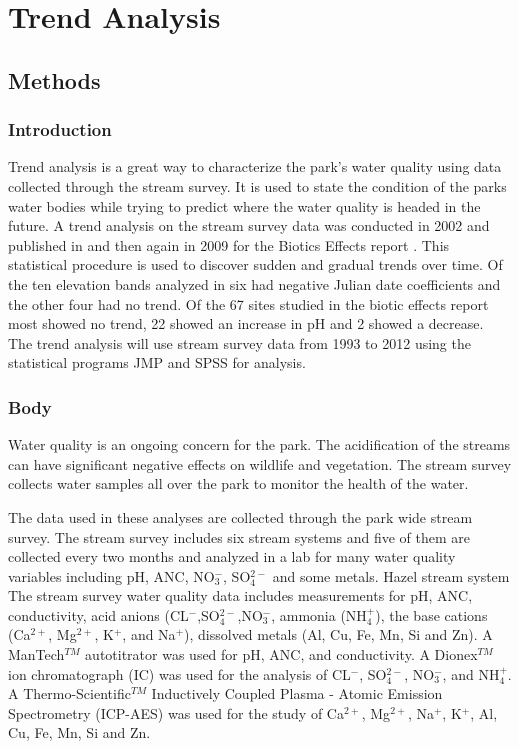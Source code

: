 \chapter{Trend Analysis}\label{ch:TA}
\section{Methods}
\subsection{Introduction}

Trend analysis is a great way to characterize the park's water quality using data collected through the stream survey. It is used to state the condition of the parks water bodies while trying to predict where the water quality is headed in the future. A trend analysis on the stream survey data was conducted in 2002 and published in \citet{robinson2008ph} and then again in 2009 for the Biotics Effects report \citep{cai2012}. This statistical procedure is used to discover sudden and gradual trends over time. Of the ten elevation bands analyzed in \citet{robinson2008ph} six had negative Julian date coefficients and the other four had no trend. Of the 67 sites studied in the biotic effects report most showed no trend, 22 showed an increase in pH and 2 showed a decrease\citep{cai2012}. The trend analysis will use stream survey data from 1993 to 2012 using the statistical programs JMP and SPSS for analysis.

\subsection{Body}

Water quality is an ongoing concern for the park. The acidification of the streams can have significant negative effects on wildlife and vegetation. The stream survey collects water samples all over the park to monitor the health of the water. 
    
 The data used in these analyses are collected through the park wide stream survey. The stream survey includes six stream systems and five of them are collected every two months and analyzed in a lab for many water quality variables including pH, ANC, NO$_3^-$, SO$_4^{2-}$ and some metals.  Hazel stream system %
The stream survey water quality data includes measurements for pH, ANC, conductivity, acid anions (CL$^-$,SO$_4^{2-}$,NO$_3^-$, ammonia (NH$_4^+$), the base cations (Ca$^{2+}$, Mg$^{2+}$, K$^+$, and Na$^+$), dissolved metals (Al, Cu, Fe, Mn, Si and Zn).  A ManTech$^{TM}$ autotitrator was used for pH, ANC, and conductivity.  A Dionex$^{TM}$ ion chromatograph (IC) was used for the analysis of CL$^-$, SO$_4^{2-}$, NO$_3^-$, and NH$_4^+$.  A Thermo-Scientific$^{TM}$ Inductively Coupled Plasma - Atomic Emission Spectrometry (ICP-AES) was used for the study of Ca$^{2+}$, Mg$^{2+}$, Na$^+$, K$^+$, Al, Cu, Fe, Mn, Si and Zn.

